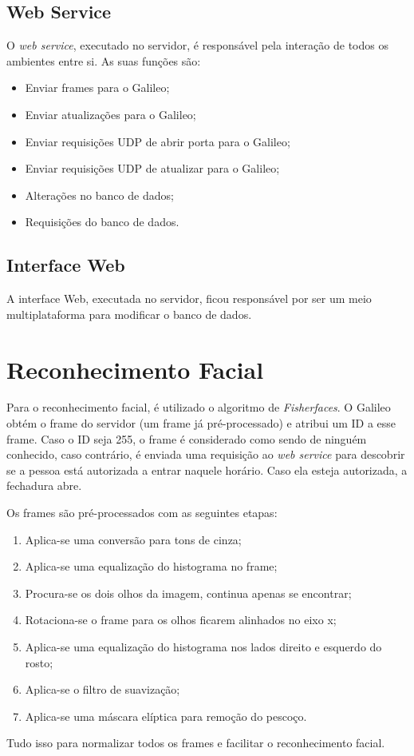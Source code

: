 \documentclass[12pt]{article}
\begin{document}
\subsection{Web Service}
    O \textit{web service}, executado no servidor, é responsável pela interação
    de todos os ambientes entre si. As suas funções são:
    \begin{itemize}
        \item Enviar frames para o Galileo;
        \item Enviar atualizações para o Galileo;
        \item Enviar requisições UDP de abrir porta para o Galileo;
        \item Enviar requisições UDP de atualizar para o Galileo;
        \item Alterações no banco de dados;
        \item Requisições do banco de dados.
    \end{itemize}

\subsection{Interface Web}
    A interface Web, executada no servidor, ficou responsável por ser um meio
    multiplataforma para modificar o banco de dados.

\section{Reconhecimento Facial}
    Para o reconhecimento facial, é utilizado o algoritmo de \textit{Fisherfaces}.
    O Galileo obtém o frame do servidor (um frame já pré-processado) e atribui
    um ID a esse frame. Caso o ID seja 255, o frame é considerado como sendo de
    ninguém conhecido, caso contrário, é enviada uma requisição ao
    \textit{web service} para descobrir se a pessoa está autorizada a entrar
    naquele horário. Caso ela esteja autorizada, a fechadura abre.

    Os frames são pré-processados com as seguintes etapas:
    \begin{enumerate}
        \item Aplica-se uma conversão para tons de cinza;
        \item Aplica-se uma equalização do histograma no frame;
        \item Procura-se os dois olhos da imagem, continua apenas se encontrar;
        \item Rotaciona-se o frame para os olhos ficarem alinhados no eixo x;
        \item Aplica-se uma equalização do histograma nos lados direito e
        esquerdo do rosto;
        \item Aplica-se o filtro de suavização;
        \item Aplica-se uma máscara elíptica para remoção do pescoço.
    \end{enumerate}
     Tudo isso para normalizar todos os frames e facilitar o reconhecimento
     facial.
\end{document}

